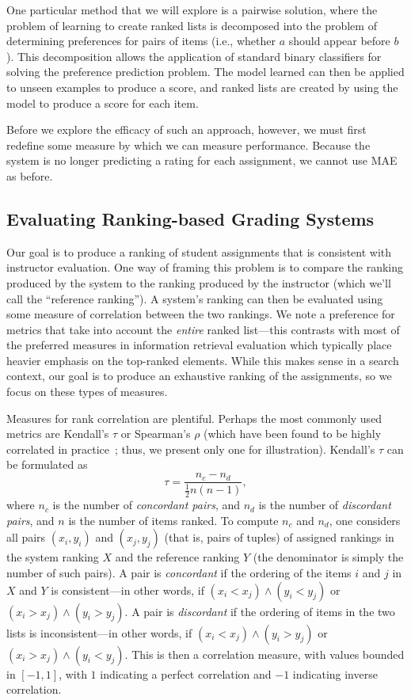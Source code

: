 One particular method that we will explore is a pairwise solution, where
the problem of learning to create ranked lists is decomposed into the
problem of determining preferences for pairs of items (i.e., whether $a$ should
appear before $b$). This decomposition allows the application of standard
binary classifiers for solving the preference prediction problem. The model
learned can then be applied to unseen examples to produce a score, and
ranked lists are created by using the model to produce a score for each
item.

Before we explore the efficacy of such an approach, however, we must first
redefine some measure by which we can measure performance. Because the
system is no longer predicting a rating for each assignment, we cannot use
MAE as before.

\subsection{Evaluating Ranking-based Grading Systems}
Our goal is to produce a ranking of student assignments that is consistent
with instructor evaluation. One way of framing this problem is to compare
the ranking produced by the system to the ranking produced by the
instructor (which we'll call the ``reference ranking''). A system's ranking
can then be evaluated using some measure of correlation between the two
rankings. We note a preference for metrics that take into account the
\emph{entire} ranked list---this contrasts with most of the preferred
measures in information retrieval evaluation which typically place heavier
emphasis on the top-ranked elements. While this makes sense in a search
context, our goal is to produce an exhaustive ranking of the assignments,
so we focus on these types of measures.

Measures for rank correlation are plentiful. Perhaps the most commonly
used metrics are Kendall's $\tau$ or Spearman's $\rho$ (which have been
found to be highly correlated in practice~\cite{Shani:2011:Springer}; thus,
we present only one for illustration). Kendall's $\tau$ can be formulated
as
\[
    \tau = \frac{n_c - n_d}{\frac{1}{2} n (n-1)},
\]
where $n_c$ is the number of \emph{concordant pairs}, and $n_d$ is the number
of \emph{discordant pairs}, and $n$ is the number of items ranked. To
compute $n_c$ and $n_d$, one considers all pairs $(x_i, y_i)$ and $(x_j,
y_j)$ (that is, pairs of tuples) of assigned rankings in the system ranking
$X$ and the reference ranking $Y$ (the denominator is simply the number of
such pairs). A pair is \emph{concordant} if the ordering of the items $i$
and $j$ in $X$ and $Y$ is consistent---in other words, if $(x_i < x_j)
\land (y_i < y_j)$ or $(x_i > x_j) \land (y_i > y_j)$.  A pair is
\emph{discordant} if the ordering of items in the two lists is
inconsistent---in other words, if $(x_i < x_j) \land (y_i > y_j)$ or $(x_i
> x_j) \land (y_i < y_j)$. This is then a correlation measure, with values
bounded in $[-1, 1]$, with $1$ indicating a perfect correlation and $-1$
indicating inverse correlation.

